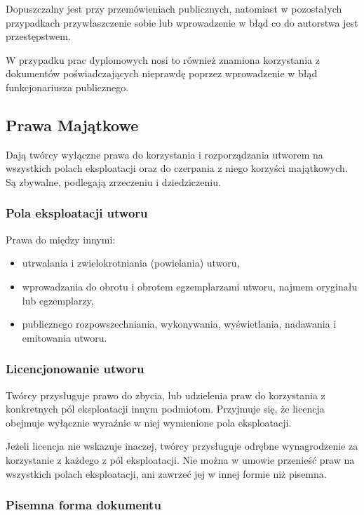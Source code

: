 \documentclass{article}
\begin{document}
Dopuszczalny jest przy przemówieniach publicznych, natomiast w pozostałych przypadkach przywłaszczenie sobie lub wprowadzenie w błąd co do autorstwa jest przestępstwem.

W przypadku prac dyplomowych nosi to również znamiona korzystania z dokumentów poświadczających nieprawdę poprzez wprowadzenie w błąd funkcjonariusza publicznego.

\subsection{Prawa Majątkowe}

Dają twórcy wyłączne prawa do korzystania i rozporządzania utworem na wszystkich polach eksploatacji oraz do czerpania z niego korzyści majątkowych. Są zbywalne, podlegają zrzeczeniu i dziedziczeniu.

\subsubsection{Pola eksploatacji utworu}

Prawa do między innymi:
\begin{itemize}
  \item utrwalania i zwielokrotniania (powielania) utworu,
  \item wprowadzania do obrotu i obrotem egzemplarzami utworu, najmem oryginału lub egzemplarzy,
  \item publicznego rozpowszechniania, wykonywania, wyświetlania, nadawania i emitowania utworu.
\end{itemize}

\subsubsection{Licencjonowanie utworu}

Twórcy przysługuje prawo do zbycia, lub udzielenia praw do korzystania z konkretnych pól eksploatacji innym podmiotom.
Przyjmuje się, że licencja obejmuje wyłącznie wyraźnie w niej wymienione pola eksploatacji.

Jeżeli licencja nie wskazuje inaczej, twórcy przysługuje odrębne wynagrodzenie za korzystanie z każdego z pól eksploatacji. Nie można w umowie przenieść praw na wszystkich polach eksploatacji, ani zawrzeć jej w innej formie niż pisemna.

\subsubsection{Pisemna forma dokumentu}
\end{document}
